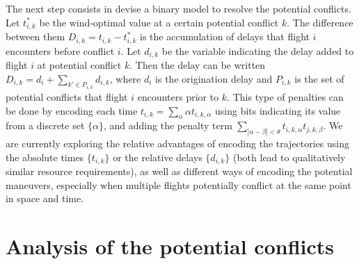 \documentclass[twocolumn,9pt]{article}
\begin{document}
The next step consists in devise a binary model to resolve the potential conflicts. Let 
$t_{i,k}^*$ be the wind-optimal value at a certain potential conflict $k$. 
The difference between them $D_{i,k} = t_{i,k} - t^*_{i,k}$ 
is the accumulation of delays that flight $i$ encounters before conflict $i$.
Let $d_{i,k}$ be the variable indicating the delay added to flight $i$ at potential conflict $k$.
Then the delay can be written $D_{i,k} = d_i + \sum_{k' \in P_{i,k}} d_{i,k}$, 
where $d_i$ is the origination delay and $P_{i,k}$ is the set of potential conflicts that flight $i$ 
encounters prior to $k$.
This type of penalties can be done by encoding each time $t_{i,k} = \sum_{\alpha} \alpha t_{i,k,\alpha}$ 
using bits indicating its value from a discrete set $\{\alpha\}$, and adding the penalty term 
$\sum_{|\alpha - \beta| < \theta} t_{i,k,\alpha} t_{j,k,\beta}$.
We are currently exploring the relative advantages of encoding the trajectories using the absolute 
times $\{t_{i,k}\}$ or the relative delays $\{d_{i,k}\}$ (both lead to qualitatively similar resource 
requirements), as well as different ways of encoding the potential maneuvers, especially when multiple 
flights potentially conflict at the same point in space and time.

\section*{Analysis of the potential conflicts}
\end{document}
